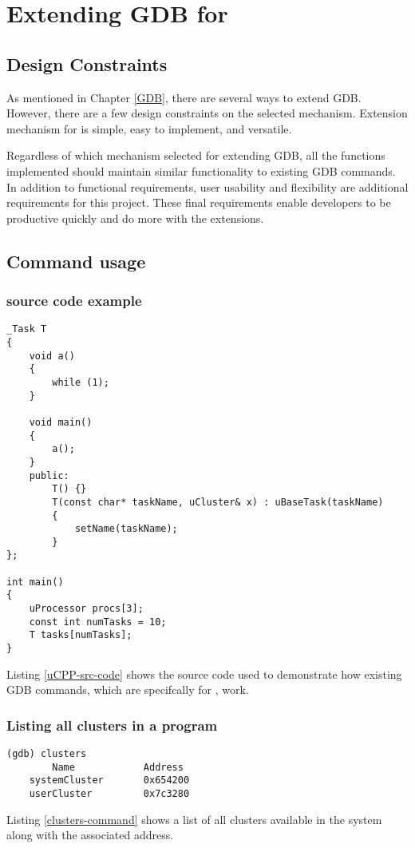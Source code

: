 \chapter{Extending GDB for \uCPP}
\section{Design Constraints}
As mentioned in Chapter \ref{GDB}, there are several ways to extend GDB. However,
there are a few design constraints on the selected mechanism. Extension
mechanism for \uCPPS is simple, easy to implement, and versatile.

Regardless of which mechanism selected for extending GDB, all the functions
implemented should maintain similar functionality to existing GDB commands. In addition to functional
requirements, user usability and flexibility are additional requirements for this
project. These final requirements enable developers to be productive quickly
and do more with the extensions.

\section{Command usage}
\subsection{\uCPPS source code example}
\begin{lstlisting}[caption={\uCPPS source code used for GDB commands},
label={uCPP-src-code}, basicstyle=\small]
_Task T
{
    void a()
    {
        while (1);
    }

    void main()
    {
        a();
    }
    public:
        T() {}
        T(const char* taskName, uCluster& x) : uBaseTask(taskName)
        {
            setName(taskName);
        }
};

int main()
{
    uProcessor procs[3];
    const int numTasks = 10;
    T tasks[numTasks];
}
\end{lstlisting}
Listing \ref{uCPP-src-code} shows the \uCPPS source code used to demonstrate
how existing GDB commands, which are specifcally for \uCPPS, work.
\subsection{Listing all clusters in a \uCPPS program}
\begin{lstlisting}[caption={clusters command}, label={clusters-command}]
(gdb) clusters
        Name            Address
    systemCluster       0x654200
    userCluster         0x7c3280
\end{lstlisting}
Listing \ref{clusters-command} shows a list of all clusters available in the system
along with the associated address.

